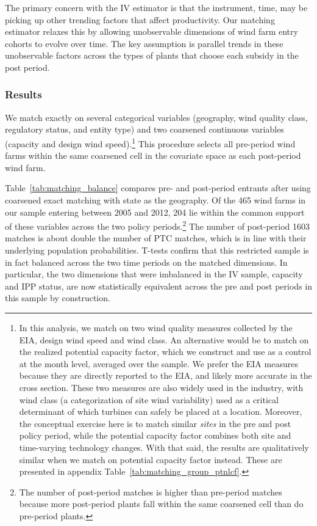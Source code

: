 \documentclass[12pt]{article}
\begin{document}
The primary concern with the IV estimator is that the instrument, time, may be picking up other trending factors that affect productivity. Our matching estimator relaxes this by allowing unobservable dimensions of wind farm entry cohorts to evolve over time. The key assumption is parallel trends in these unobservable factors across the types of plants that choose each subsidy in the post period. 

\subsubsection*{Results \label{sec:results:matching}}

We match exactly on several categorical variables (geography, wind quality class, regulatory status, and entity type) and two coarsened continuous variables (capacity and design wind speed).\footnote{In this analysis, we match on two wind quality measures collected by the EIA, design wind speed and wind class. An alternative would be to match on the realized potential capacity factor, which we construct and use as a control at the month level, averaged over the sample. We prefer the EIA measures because they are directly reported to the EIA, and likely more accurate in the cross section. These two measures are also widely used in the industry, with wind class (a categorization of site wind variability) used as a critical determinant of which turbines can safely be placed at a location. Moreover, the conceptual exercise here is to match similar \textit{sites} in the pre and post policy period, while the potential capacity factor combines both site and time-varying technology changes. With that said, the results are qualitatively similar when we match on potential capacity factor instead. These are presented in appendix Table~\ref{tab:matching_group_ptnlcf}.} This procedure selects all pre-period wind farms within the same coarsened cell in the covariate space as each post-period wind farm.

Table~\ref{tab:matching_balance} compares pre- and post-period entrants after using coarsened exact matching with state as the geography. Of the 465 wind farms in our sample entering between 2005 and 2012, 204 lie within the common support of these variables across the two policy periods.\footnote{The number of post-period matches is higher than pre-period matches because more post-period plants fall within the same coarsened cell than do pre-period plants.} The number of post-period 1603 matches is about double the number of PTC matches, which is in line with their underlying population probabilities. T-tests confirm that this restricted sample is in fact balanced across the two time periods on the matched dimensions. In particular, the two dimensions that were imbalanced in the IV sample, capacity and IPP status, are now statistically equivalent across the pre and post periods in this sample by construction. 
\end{document}
